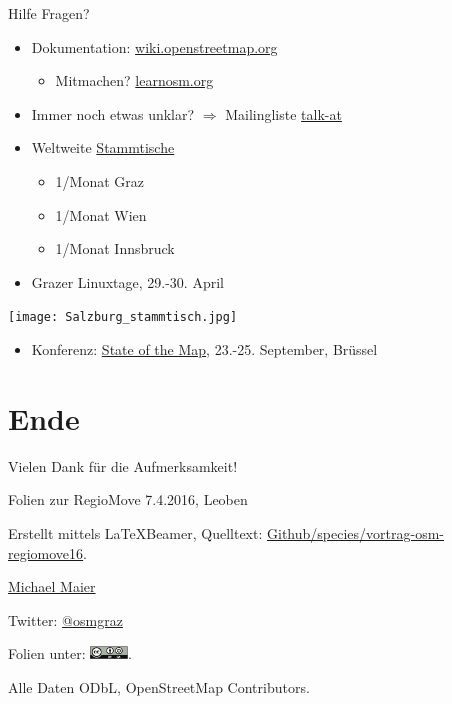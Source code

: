 \documentclass{beamer}
\begin{document}
\begin{frame}{Hilfe}
Fragen? 
\begin{itemize}
  \item Dokumentation: \href{http://wiki.openstreetmap.org}{wiki.openstreetmap.org}
  \begin{itemize} 
    \item Mitmachen? \href{http://learnosm.org/}{learnosm.org}
  \end{itemize}
  \item Immer noch etwas unklar? $\Rightarrow$ Mailingliste \href{http://lists.openstreetmap.org/listinfo/talk-at}{talk-at}
 \vspace*{0.4cm}
  \item Weltweite \href{http://usergroups.openstreetmap.de/}{Stammtische}
  \begin{itemize}
    \item 1/Monat Graz
    \item 1/Monat Wien
    \item 1/Monat Innsbruck
  \end{itemize}
 \vspace*{0.4cm}
  \item Grazer Linuxtage, 29.-30. April

\end{itemize}

 \vspace*{-2.8cm}
\hfill\texttt{[image: Salzburg\_stammtisch.jpg]}

\begin{itemize}
  \item Konferenz: \href{http://stateofthemap.org/}{State of the Map}, 23.-25. September, Brüssel
\end{itemize}
\end{frame}

\section{Ende}

\begin{frame}{Vielen Dank für die Aufmerksamkeit!}

  Folien zur RegioMove 7.4.2016, Leoben
\vspace{1cm}

Erstellt mittels \LaTeX Beamer, Quelltext: \href{https://github.com/species/vortrag-osm-regiomove16}{Github/species/vortrag-osm-regiomove16}.
\vspace{1cm}

\href{mailto:michael.maier@mailbox.org}{Michael Maier}

Twitter: \href{https://twitter.com/osmgraz}{@osmgraz}
\vspace{1cm}

Folien unter: \includegraphics[width=1cm]{cc-by-sa.pdf}. 

Alle Daten ODbL, OpenStreetMap Contributors.

\end{frame}
\end{document}
